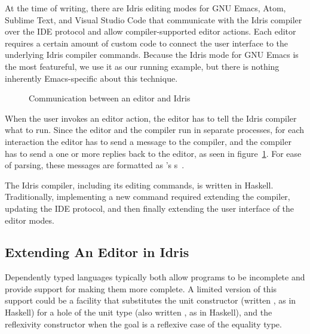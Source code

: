 At the time of writing, there are Idris editing modes for GNU Emacs,
Atom, Sublime Text, and Visual Studio Code that communicate with the
Idris compiler over the IDE protocol and allow compiler-supported
editor actions. Each editor requires a certain amount of custom code
to connect the user interface to the underlying Idris compiler
commands. Because the Idris mode for GNU Emacs is the most featureful,
we use it as our running example, but there is nothing inherently
Emacs-specific about this technique.

\begin{figure}[H]
\caption{Communication between an editor and Idris}
\label{editorDiagram}
\end{figure}

When the user invokes an editor action, the editor has to tell the
Idris compiler what to run. Since the editor and the compiler run in
separate processes, for each interaction the editor has to send a
message to the compiler, and the compiler has to send a one or more
replies back to the editor, as seen in figure~\ref{editorDiagram}.  For
ease of parsing, these messages are formatted as
\citeauthor{mccarthy}'s \sexp{}s~\citep{mccarthy}.

The Idris compiler, including its editing commands, is written in
Haskell.  Traditionally, implementing a new command required extending
the compiler, updating the IDE protocol, and then finally extending
the user interface of the editor modes.

\subsection{Extending An Editor in Idris}

Dependently typed languages typically both allow programs to be
incomplete and provide support for making them more complete. A
limited version of this support could be a facility that substitutes
the unit constructor (written \dt{()}, as in Haskell) for a hole of
the unit type (also written \ty{()}, as in Haskell), and the
reflexivity constructor  when the goal is a reflexive case of
the equality type.

